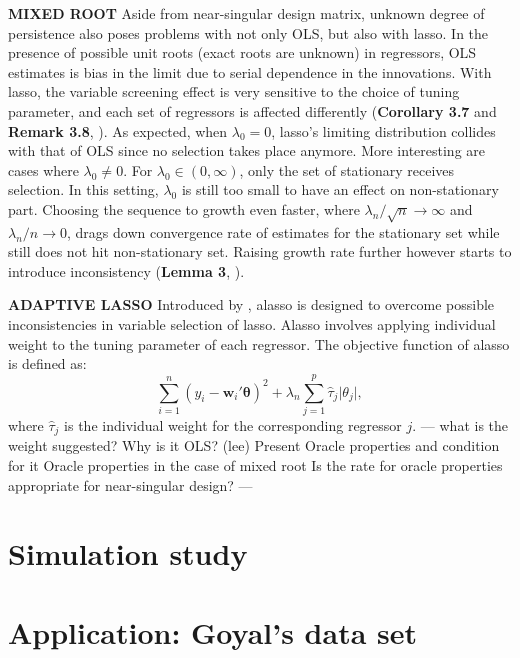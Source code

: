 \documentclass[12pt,a4paper]{article}
\DeclareMathOperator*{\argmin}{arg\,min} %
\begin{document}
\textbf{MIXED ROOT} Aside from near-singular design matrix, unknown degree of persistence also poses problems with not only OLS, but also with lasso. In the presence of possible unit roots (exact roots are unknown) in regressors, OLS estimates is bias in the limit due to serial dependence in the innovations. With lasso, the variable screening effect is very sensitive to the choice of tuning parameter, and each set of regressors is affected differently (\textbf{Corollary 3.7} and \textbf{Remark 3.8}, \cite{lee2018lasso}). As expected, when $ \lambda_0 = 0 $, lasso's limiting distribution collides with that of OLS since no selection takes place anymore. More interesting are cases where $ \lambda_0 \neq 0 $. For $ \lambda_0 \in (0, \infty) $, only the set of stationary receives selection. In this setting, $ \lambda_0 $ is still too small to have an effect on non-stationary part. Choosing the sequence to growth even faster, where  $ \lambda_n/\sqrt{n} \rightarrow \infty $ and $ \lambda_n/n \rightarrow 0 $, drags down convergence rate of estimates for the stationary set while still does not hit non-stationary set. Raising growth rate further however starts to introduce inconsistency (\textbf{Lemma 3}, \cite{zou2006adaptive}).

\textbf{ADAPTIVE LASSO} Introduced by \cite{zou2006adaptive}, alasso is designed to overcome possible inconsistencies in variable selection of lasso. Alasso involves applying individual weight to the tuning parameter of each regressor. The objective function of alasso is defined as:
\begin{equation}\label{eq:7}
	\sum_{i = 1}^n(y_i - \bm{w}_i'\bm{\theta})^2 + 
	\lambda_n\sum_{j = 1}^p \hat{\tau}_j \vert\theta_j\vert,
\end{equation}
where $ \hat{\tau}_j $ is the individual weight for the corresponding regressor $ j $.
--- what is the weight suggested? 
Why is it OLS? (lee) 
Present Oracle properties and condition for it
Oracle properties in the case of mixed root
Is the rate for oracle properties appropriate for near-singular design? ---




\section{Simulation study}

\section{Application: Goyal's data set}



\end{document}
